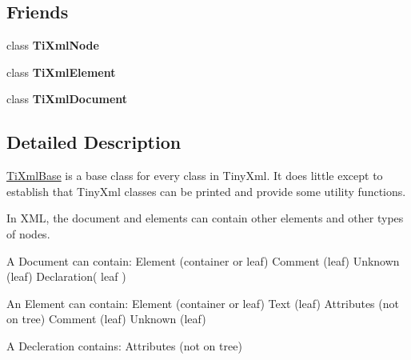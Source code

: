 \subsection*{\-Friends}
\begin{DoxyCompactItemize}
\item 
\hypertarget{class_ti_xml_base_a218872a0d985ae30e78c55adc4bdb196}{class {\bfseries \-Ti\-Xml\-Node}}\label{class_ti_xml_base_a218872a0d985ae30e78c55adc4bdb196}

\item 
\hypertarget{class_ti_xml_base_ab6592e32cb9132be517cc12a70564c4b}{class {\bfseries \-Ti\-Xml\-Element}}\label{class_ti_xml_base_ab6592e32cb9132be517cc12a70564c4b}

\item 
\hypertarget{class_ti_xml_base_a173617f6dfe902cf484ce5552b950475}{class {\bfseries \-Ti\-Xml\-Document}}\label{class_ti_xml_base_a173617f6dfe902cf484ce5552b950475}

\end{DoxyCompactItemize}


\subsection{\-Detailed \-Description}
\hyperlink{class_ti_xml_base}{\-Ti\-Xml\-Base} is a base class for every class in \-Tiny\-Xml. \-It does little except to establish that \-Tiny\-Xml classes can be printed and provide some utility functions.

\-In \-X\-M\-L, the document and elements can contain other elements and other types of nodes.

\begin{DoxyVerb}
	A Document can contain:	Element	(container or leaf)
							Comment (leaf)
							Unknown (leaf)
							Declaration( leaf )

	An Element can contain:	Element (container or leaf)
							Text	(leaf)
							Attributes (not on tree)
							Comment (leaf)
							Unknown (leaf)

	A Decleration contains: Attributes (not on tree)
	\end{DoxyVerb}
 

